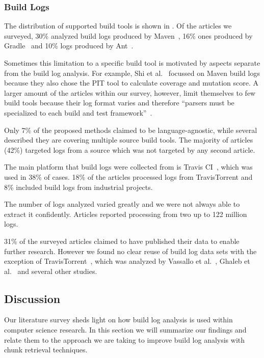 \subsubsection{Build Logs}
The distribution of supported build tools is shown in
.
Of the articles we surveyed, 30\% analyzed build logs produced by
Maven~\cite{maven2019website}, 16\% ones produced by
Gradle~\cite{gradle2020website}
and 10\% logs produced by Ant~\cite{ant2020website}.

Sometimes this limitation to a specific build tool is motivated by
aspects separate from the build log analysis.
For example, Shi et al.~\cite{shi2018evaluating} focussed on Maven
build logs because they also chose the PIT tool to calculate coverage
and mutation score.
A larger amount of the articles within our survey, however, limit
themselves to few build tools because their log format varies and
therefore ``parsers must be specialized to each build and test
framework''~\cite{tomassi2019bugswarm}.

Only 7\% of the proposed methods claimed to be language-agnostic, while
several described they are covering multiple source build tools.
The majority of articles (42\%) targeted logs from a source which was not
targeted by any second article.

The main platform that build logs were collected from is Travis
CI~\cite{travisci2019webpage},
which was used in 38\% of cases.
18\% of the articles processed logs from TravisTorrent and 8\% included
build logs from industrial projects.

The number of logs analyzed varied greatly and we were not always able to
extract it confidently.
Articles reported processing from two up to 122 million logs.

31\% of the surveyed articles claimed to have published their data to
enable further research.
However we found no clear reuse of build log data sets with the
exception of TravisTorrent~\cite{beller2017travistorrent}, which was
analyzed by Vassallo et al.~\cite{vassallo2017a-tale},
Ghaleb et al.~\cite{ghaleb2019studying} and several other studies.

\subsection{Discussion}
Our literature survey sheds light on how build log analysis is used within
computer science research.
In this section we will summarize our findings and relate them to the
approach we are taking to improve build log analysis with chunk
retrieval techniques.

